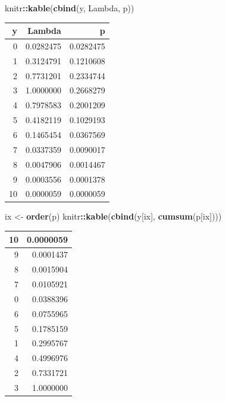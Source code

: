 \documentclass[
  12pt,
]{book}
\newenvironment{Shaded}{\begin{snugshade}}{\end{snugshade}}
\newcommand{\KeywordTok}[1]{\textcolor[rgb]{0.13,0.29,0.53}{\textbf{#1}}}
\newcommand{\NormalTok}[1]{#1}
\newcommand{\OperatorTok}[1]{\textcolor[rgb]{0.81,0.36,0.00}{\textbf{#1}}}
\newcommand{\StringTok}[1]{\textcolor[rgb]{0.31,0.60,0.02}{#1}}
\begin{document}
\begin{Shaded}
\begin{Highlighting}[]
\NormalTok{knitr}\OperatorTok{::}\KeywordTok{kable}\NormalTok{(}\KeywordTok{cbind}\NormalTok{(y, Lambda, p))}
\end{Highlighting}
\end{Shaded}

\begin{tabular}{r|r|r}
\hline
y & Lambda & p\\
\hline
0 & 0.0282475 & 0.0282475\\
\hline
1 & 0.3124791 & 0.1210608\\
\hline
2 & 0.7731201 & 0.2334744\\
\hline
3 & 1.0000000 & 0.2668279\\
\hline
4 & 0.7978583 & 0.2001209\\
\hline
5 & 0.4182119 & 0.1029193\\
\hline
6 & 0.1465454 & 0.0367569\\
\hline
7 & 0.0337359 & 0.0090017\\
\hline
8 & 0.0047906 & 0.0014467\\
\hline
9 & 0.0003556 & 0.0001378\\
\hline
10 & 0.0000059 & 0.0000059\\
\hline
\end{tabular}

\begin{Shaded}
\begin{Highlighting}[]
\NormalTok{ix \textless{}{-}}\StringTok{ }\KeywordTok{order}\NormalTok{(p)}
\NormalTok{knitr}\OperatorTok{::}\KeywordTok{kable}\NormalTok{(}\KeywordTok{cbind}\NormalTok{(y[ix], }\KeywordTok{cumsum}\NormalTok{(p[ix])))}
\end{Highlighting}
\end{Shaded}

\begin{tabular}{r|r}
\hline
10 & 0.0000059\\
\hline
9 & 0.0001437\\
\hline
8 & 0.0015904\\
\hline
7 & 0.0105921\\
\hline
0 & 0.0388396\\
\hline
6 & 0.0755965\\
\hline
5 & 0.1785159\\
\hline
1 & 0.2995767\\
\hline
4 & 0.4996976\\
\hline
2 & 0.7331721\\
\hline
3 & 1.0000000\\
\hline
\end{tabular}
\end{document}
